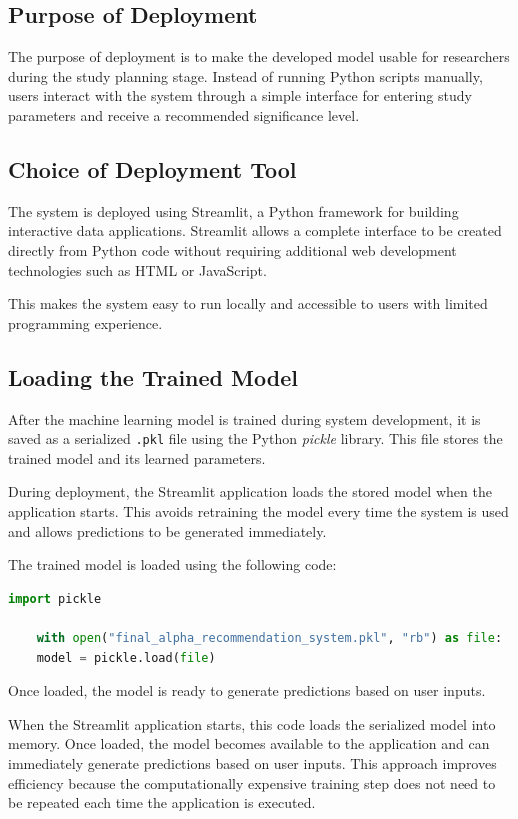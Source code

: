 \subsection{Purpose of Deployment}

The purpose of deployment is to make the developed model usable for researchers during the study planning stage. Instead of running Python scripts manually, users interact with the system through a simple interface for entering study parameters and receive a recommended significance level.

\subsection{Choice of Deployment Tool}

The system is deployed using Streamlit, a Python framework for building interactive data applications. Streamlit allows a complete interface to be created directly from Python code without requiring additional web development technologies such as HTML or JavaScript\cite{streamlit-docs2024}.

This makes the system easy to run locally and accessible to users with limited programming experience.


\subsection{Loading the Trained Model}

After the machine learning model is trained during system development, it is saved as a serialized \texttt{.pkl} file using the Python \textit{pickle} library. This file stores the trained model and its learned parameters.

During deployment, the Streamlit application loads the stored model when the application starts. This avoids retraining the model every time the system is used and allows predictions to be generated immediately.


The trained model is loaded using the following code:

\begin{lstlisting}[language=Python]
	import pickle
	
	with open("final_alpha_recommendation_system.pkl", "rb") as file:
	model = pickle.load(file)
\end{lstlisting}

Once loaded, the model is ready to generate predictions based on user inputs.


When the Streamlit application starts, this code loads the serialized model into memory. Once loaded, the model becomes available to the application and can immediately generate predictions based on user inputs. This approach improves efficiency because the computationally expensive training step does not need to be repeated each time the application is executed.

